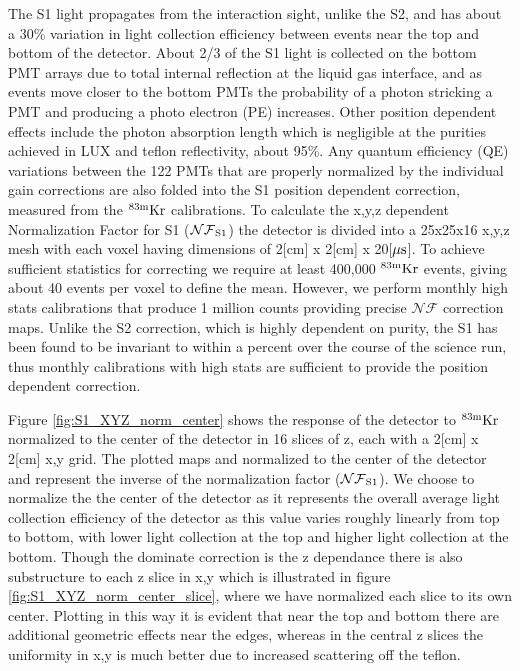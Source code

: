 The S1 light propagates from the interaction sight, unlike the S2, and has about a 30\% variation in light collection efficiency between events near the top and bottom of the detector. About 2/3 of the S1 light is collected on the bottom PMT arrays due to total internal reflection at the liquid gas interface, and as events move closer to the bottom PMTs the probability of a photon stricking a PMT and producing a photo electron (PE) increases. Other position dependent effects include the photon absorption length which is negligible at the purities achieved in LUX and teflon reflectivity, about 95\%. Any quantum efficiency (QE) variations between the 122 PMTs that are properly normalized by the individual gain corrections are also folded into the S1 position dependent correction, measured from the $\rm^{83m}Kr$ calibrations.
To calculate the x,y,z dependent Normalization Factor for S1 ($\rm \mathcal{NF}_{S1}$) the detector is divided into a 25x25x16 x,y,z mesh with each voxel having dimensions of 2[cm] x 2[cm] x 20[$\rm \mu s$]. To achieve sufficient statistics for correcting we require at least 400,000 $\rm^{83m}Kr$ events, giving about 40 events per voxel to define the mean. However, we perform monthly high stats calibrations that produce 1 million counts providing precise $\mathcal{NF}$ correction maps. Unlike the S2 correction, which is highly dependent on purity, the S1 has been found to be invariant to within a percent over the course of the science run, thus monthly calibrations with high stats are sufficient to provide the position dependent correction.

Figure \ref{fig:S1_XYZ_norm_center} shows the response of the detector to $\rm^{83m}Kr$ normalized to the center of the detector in 16 slices of z, each with a 2[cm] x 2[cm] x,y grid. The plotted maps and normalized to the center of the detector and represent the inverse of the normalization factor ($\rm \mathcal{NF}_{S1}$). We choose to normalize the the center of the detector as it represents the overall average light collection efficiency of the detector as this value varies roughly linearly from top to bottom, with lower light collection at the top and higher light collection at the bottom. Though the dominate correction is the z dependance there is also substructure to each z slice in x,y which is illustrated in figure \ref{fig:S1_XYZ_norm_center_slice}, where we have normalized each slice to its own center. Plotting in this way it is evident that near the top and bottom there are additional geometric effects near the edges, whereas in the central z slices the uniformity in x,y is much better due to increased scattering off the teflon.

